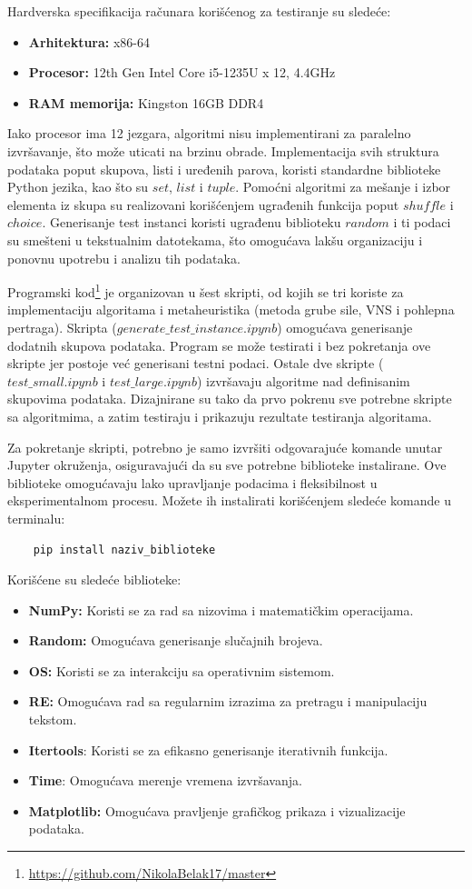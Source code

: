 \documentclass[12pt,oneside]{memoir}
\begin{document}
Hardverska specifikacija računara korišćenog za testiranje su sledeće:
\begin{itemize}
    \item \textbf{Arhitektura:} x86-64
    \item \textbf{Procesor:} 12th Gen Intel Core i5-1235U x 12, 4.4GHz
    \item \textbf{RAM memorija:} Kingston 16GB DDR4
\end{itemize}

Iako procesor ima 12 jezgara, algoritmi nisu implementirani za paralelno izvršavanje, što može uticati na brzinu obrade. Implementacija svih struktura podataka poput skupova, listi i uređenih parova, koristi standardne biblioteke Python jezika, kao što su $set$, $list$ i $tuple$. Pomoćni algoritmi za mešanje i izbor elementa iz skupa su realizovani korišćenjem ugrađenih funkcija poput $shuffle$ i $choice$. Generisanje test instanci koristi ugrađenu biblioteku $random$ i ti podaci su smešteni u tekstualnim datotekama, što omogućava lakšu organizaciju i ponovnu upotrebu i analizu tih podataka.

Programski kod\footnote{\url{https://github.com/NikolaBelak17/master}} je organizovan u šest skripti, od kojih se tri koriste za implementaciju algoritama i metaheuristika (metoda grube sile, VNS i pohlepna pertraga). Skripta ($generate\_test\_instance.ipynb$) omogućava generisanje dodatnih skupova podataka. Program se može testirati i bez pokretanja ove skripte jer postoje već generisani testni podaci. Ostale dve skripte ($test\_small.ipynb$ i $test\_large.ipynb$) izvršavaju algoritme nad definisanim skupovima podataka. Dizajnirane su tako da prvo pokrenu sve potrebne skripte sa algoritmima, a zatim testiraju i prikazuju rezultate testiranja algoritama.

Za pokretanje skripti, potrebno je samo izvršiti odgovarajuće komande unutar Jupyter okruženja, osiguravajući da su sve potrebne biblioteke instalirane. Ove biblioteke omogućavaju lako upravljanje podacima i fleksibilnost u eksperimentalnom procesu. Možete ih instalirati korišćenjem sledeće komande u terminalu:
\begin{verbatim}
    pip install naziv_biblioteke
\end{verbatim}
Korišćene su sledeće biblioteke: 
\begin{itemize}
    \item \textbf{NumPy:} Koristi se za rad sa nizovima i matematičkim operacijama.
    \item \textbf{Random:} Omogućava generisanje slučajnih brojeva.
    \item \textbf{OS:} Koristi se za interakciju sa operativnim sistemom.
    \item \textbf{RE:} Omogućava rad sa regularnim izrazima za pretragu i manipulaciju tekstom.
    \item \textbf{Itertools}: Koristi se za efikasno generisanje iterativnih funkcija.
    \item \textbf{Time}: Omogućava merenje vremena izvršavanja.
    \item \textbf{Matplotlib:} Omogućava pravljenje grafičkog prikaza i vizualizacije podataka.
\end{itemize}
\end{document}
